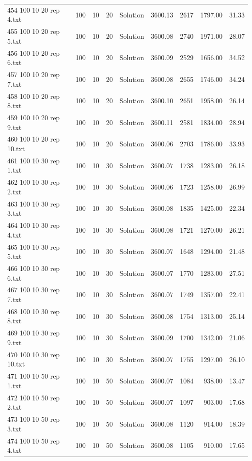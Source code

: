 \begin{longtable}{lrrllrrrr}
454 100 10 20 rep 4.txt & 100 & 10 & 20 & Solution & 3600.13 & 2617 & 1797.00 & 31.33\\
455 100 10 20 rep 5.txt & 100 & 10 & 20 & Solution & 3600.08 & 2740 & 1971.00 & 28.07\\
456 100 10 20 rep 6.txt & 100 & 10 & 20 & Solution & 3600.09 & 2529 & 1656.00 & 34.52\\
457 100 10 20 rep 7.txt & 100 & 10 & 20 & Solution & 3600.08 & 2655 & 1746.00 & 34.24\\
458 100 10 20 rep 8.txt & 100 & 10 & 20 & Solution & 3600.10 & 2651 & 1958.00 & 26.14\\
459 100 10 20 rep 9.txt & 100 & 10 & 20 & Solution & 3600.11 & 2581 & 1834.00 & 28.94\\
460 100 10 20 rep 10.txt & 100 & 10 & 20 & Solution & 3600.06 & 2703 & 1786.00 & 33.93\\
461 100 10 30 rep 1.txt & 100 & 10 & 30 & Solution & 3600.07 & 1738 & 1283.00 & 26.18\\
462 100 10 30 rep 2.txt & 100 & 10 & 30 & Solution & 3600.06 & 1723 & 1258.00 & 26.99\\
463 100 10 30 rep 3.txt & 100 & 10 & 30 & Solution & 3600.08 & 1835 & 1425.00 & 22.34\\
464 100 10 30 rep 4.txt & 100 & 10 & 30 & Solution & 3600.08 & 1721 & 1270.00 & 26.21\\
465 100 10 30 rep 5.txt & 100 & 10 & 30 & Solution & 3600.07 & 1648 & 1294.00 & 21.48\\
466 100 10 30 rep 6.txt & 100 & 10 & 30 & Solution & 3600.07 & 1770 & 1283.00 & 27.51\\
467 100 10 30 rep 7.txt & 100 & 10 & 30 & Solution & 3600.07 & 1749 & 1357.00 & 22.41\\
468 100 10 30 rep 8.txt & 100 & 10 & 30 & Solution & 3600.08 & 1754 & 1313.00 & 25.14\\
469 100 10 30 rep 9.txt & 100 & 10 & 30 & Solution & 3600.09 & 1700 & 1342.00 & 21.06\\
470 100 10 30 rep 10.txt & 100 & 10 & 30 & Solution & 3600.07 & 1755 & 1297.00 & 26.10\\
471 100 10 50 rep 1.txt & 100 & 10 & 50 & Solution & 3600.07 & 1084 & 938.00 & 13.47\\
472 100 10 50 rep 2.txt & 100 & 10 & 50 & Solution & 3600.07 & 1097 & 903.00 & 17.68\\
473 100 10 50 rep 3.txt & 100 & 10 & 50 & Solution & 3600.08 & 1120 & 914.00 & 18.39\\
474 100 10 50 rep 4.txt & 100 & 10 & 50 & Solution & 3600.08 & 1105 & 910.00 & 17.65\\

\end{longtable}
